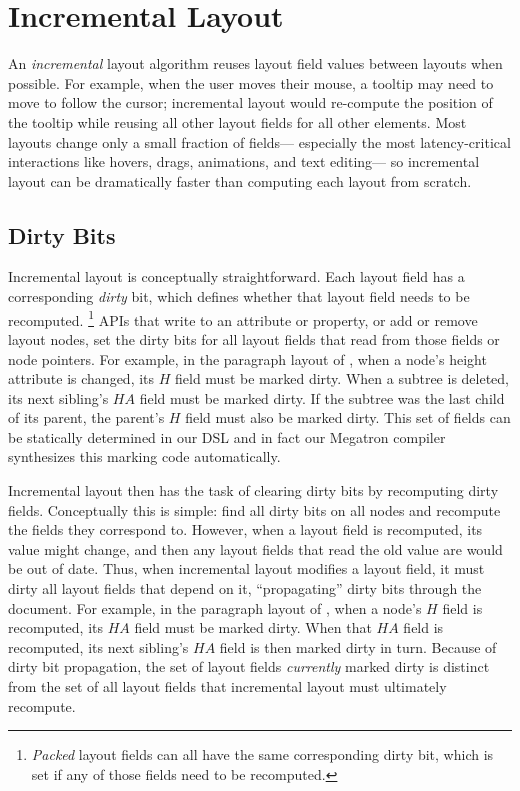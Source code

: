\section{Incremental Layout}

An \emph{incremental} layout algorithm
  reuses layout field values between layouts when possible.
For example, when the user moves their mouse,
  a tooltip may need to move to follow the cursor;
  incremental layout would re-compute the position of the tooltip
  while reusing all other layout fields for all other elements.
Most layouts change only a small fraction of fields---%
  especially the most latency-critical interactions
  like hovers, drags, animations, and text editing---%
  so incremental layout can be dramatically faster
  than computing each layout from scratch.

\subsection{Dirty Bits}
\label{sec:recompute-phase}

Incremental layout is conceptually straightforward. 
Each layout field has a corresponding \textit{dirty} bit,
  which defines whether that layout field needs to be recomputed.%
\footnote{\emph{Packed} layout fields can all have
  the same corresponding dirty bit,
  which is set if any of those fields need to be recomputed.}
APIs that write to an attribute or property,
  or add or remove layout nodes,
  set the dirty bits for all layout fields
  that read from those fields or node pointers.
For example,
  in the paragraph layout of ,
  when a node's \textsf{height} attribute is changed,
  its $H$ field must be marked dirty.
When a subtree is deleted,
  its next sibling's $HA$ field must be marked dirty.
If the subtree was the last child of its parent,
  the parent's $H$ field must also be marked dirty.
This set of fields can be statically determined in our DSL
  and in fact our Megatron compiler synthesizes
  this marking code automatically.

Incremental layout then has the task of clearing dirty bits
  by recomputing dirty fields.
Conceptually this is simple:
  find all dirty bits on all nodes and recompute
  the fields they correspond to.
However, when a layout field is recomputed,
  its value might change,
  and then any layout fields that read the old value
  are would be out of date.
Thus, when incremental layout modifies a layout field,
  it must dirty all layout fields that depend on it,
  ``propagating'' dirty bits through the document.
For example,
  in the paragraph layout of ,
  when a node's $H$ field is recomputed,
  its $HA$ field must be marked dirty.
When that $HA$ field is recomputed,
  its next sibling's $HA$ field is then marked dirty in turn.
Because of dirty bit propagation,
  the set of layout fields \emph{currently} marked dirty
  is distinct from the set of all layout fields
  that incremental layout must ultimately recompute.

